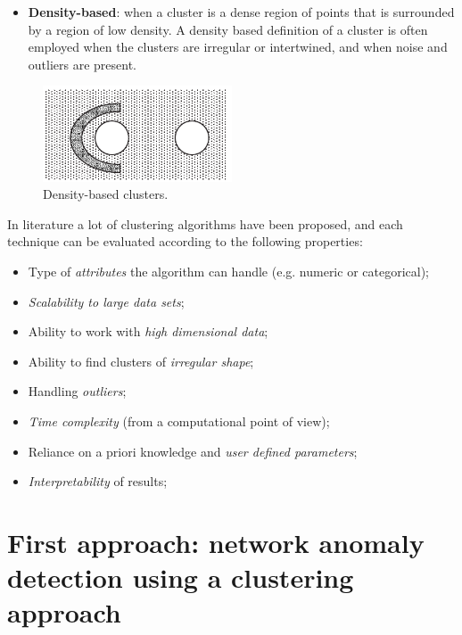 \documentclass[12pt,a4paper,cucitura]{toptesi}
\begin{document}
\begin{itemize}
\item \textbf{Density-based}: when a cluster is a dense region of points that is surrounded by a region of low density. 
A density based definition of a cluster is often employed when the clusters are irregular or intertwined, and when noise and outliers are present.
\end{itemize}

\begin{figure}
\centering
\includegraphics[width=0.5\textwidth]{clusters-density.png}
\caption{Density-based clusters.}
\end{figure}

In literature a lot of clustering algorithms have been proposed, and each technique can be evaluated according to the following properties:

\begin{itemize}
\item Type of \emph{attributes} the algorithm can handle (e.g. numeric or categorical);
\item \emph{Scalability to large data sets};
\item Ability to work with \emph{high dimensional data};
\item Ability to find clusters of \emph{irregular shape};
\item Handling \emph{outliers};
\item \emph{Time complexity} (from a computational point of view);
\item Reliance on a priori knowledge and \emph{user defined parameters};
\item \emph{Interpretability} of results;
\end{itemize}

\chapter{First approach: network anomaly detection using a clustering approach}
\end{document}
